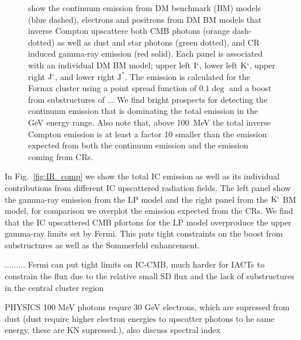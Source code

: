 \documentclass[10pt,aps,pra,reprint,amsmath,amsfonts,amssymb,showpacs]{revtex4-1}
\newcommand{\rmn}{\mathrm}
\newcommand{\Kp}{\rmn{K}`}
\newcommand{\Ip}{\rmn{I}`}
\newcommand{\Js}{\rmn{J}^*}
\newcommand{\Jp}{\rmn{J}`}
\begin{document}
\begin{figure}
\begin{minipage}{2.0\columnwidth}
{  show the continuum emission from DM benchmark (BM) models (blue
  dashed), electrons and positrons from DM BM models that inverse
  Compton upscattere both CMB photons (orange dash-dotted) as well as
  dust and star photons (green dotted), and CR induced gamma-ray
  emission (red solid). Each panel is associated with an individual DM
  BM model; upper left $\Ip$, lower left $\Kp$, upper right $\Jp$, and
  lower right $\Js$. The emission is calculated for the Fornax cluster
  using a point spread function of $0.1\deg$ and a boost from
  substructures of ...  We find bright prospects for detecting the
  continuum emission that is dominating the total emission in the GeV
  energy range. Also note that, above 100~MeV the total inverse
  Compton emission is at least a factor 10 smaller than the emission
  expected from both the continuum emission and the emission coming
  from CRs.}
 \label{fig:diff_BM}
\end{minipage}
\end{figure}

In Fig.~\ref{fig:IR_comp} we show the total IC emission as well as its
individual contributions from different IC upscattered radiation
fields. The left panel show the gamma-ray emission from the LP model
and the right panel from the $\Kp$ BM model, for comparison we
overplot the emission expected from the CRs. We find that the IC
upscattered CMB pfortons for the LP model overproduce the upper
gamma-ray limits set by Fermi. This puts tight constraints on the
boost from substructures as well as the Sommerfeld enhancement. 

.........
Fermi can put tight limits on IC-CMB, much harder for IACTs to
constrain the flux due to the relative small SD flux and the lack of
substructures in the central cluster region

PHYSICS
100 MeV photons requre 30 GeV electrons, which are supressed from dust
(dust require higher electron energies to upscatter photons to he same
energy, these are KN supressed.), also discuss spectral index
\end{document}
